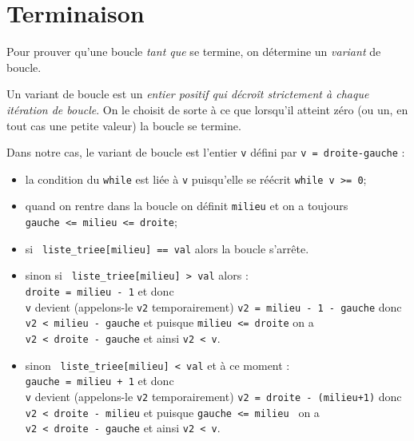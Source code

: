 \section{Terminaison}

Pour prouver qu'une boucle \textit{tant que} se termine, on détermine un \textit{variant} de boucle.

\begin{definition}[]
Un variant de boucle est un \textit{entier positif qui décroît strictement à chaque itération de boucle}. On le choisit de sorte à ce que lorsqu'il atteint zéro (ou un, en tout cas une petite valeur) la boucle se termine.\\
\end{definition}

Dans notre cas, le variant de boucle est l'entier \texttt{v} défini par \texttt{v = droite-gauche} :
\begin{itemize}
    \item   la condition du \texttt{while} est liée à \texttt{v} puisqu'elle se réécrit \texttt{while v >= 0};
    \item   quand on rentre dans la boucle on définit \texttt{milieu} et on a toujours \\
    \texttt{gauche <= milieu <= droite};
    \item   si \texttt{ liste_triee[milieu] == val} alors la boucle s'arrête.
        
    \item   sinon si \texttt{ liste_triee[milieu] > val} alors :\\
            \texttt{droite = milieu - 1} et donc\\
            \texttt{v} devient (appelons-le \texttt{v2} temporairement) \texttt{v2 = milieu - 1 - gauche} donc\\
            \texttt{v2 < milieu - gauche} et puisque \texttt{milieu <= droite} on a\\
            \texttt{v2 < droite - gauche} et ainsi \texttt{v2 < v}.
    \item   sinon \texttt{ liste_triee[milieu] < val} et à ce moment :\\
            \texttt{gauche = milieu + 1} et donc\\
            \texttt{v} devient (appelons-le \texttt{v2} temporairement) \texttt{v2 = droite - (milieu+1)} donc\\
            \texttt{v2 < droite - milieu} et puisque \texttt{gauche <= milieu } on a\\
            \texttt{v2 < droite - gauche} et ainsi \texttt{v2 < v}.         
\end{itemize}

